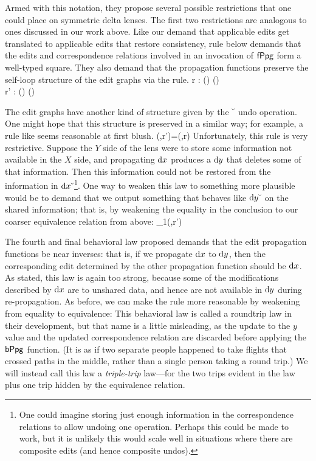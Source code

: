 Armed with this notation, they propose several possible restrictions that
one could place on symmetric delta lenses. The first two restrictions are
analogous to ones discussed in our work above. Like our demand that
applicable edits get translated to applicable edits that restore
consistency, rule  below demands that the edits and
correspondence relations involved in an invocation of $\mathsf{fPpg}$ form a
well-typed square. They also demand that the propagation functions preserve
the self-loop structure of the edit graphs via the  rule.
    {r  : \mldom(\dx) \uedge \mldom(\dy) \\
     r' : \mlcod(\dx) \uedge \mlcod(\dy)}

The edit graphs have another kind of structure given by the $\breve{\ }$
undo operation. One might hope that this structure is preserved in a similar
way; for example, a rule like  seems reasonable at first
blush.
    {\mlfppg(\dx\swoop,r')=(\dy\swoop,r)}
Unfortunately, this rule is very restrictive. Suppose the $Y$ side of the
lens were to store some information not available in the $X$ side, and
propagating $\textrm{d} x$ produces a $\textrm{d} y$ that deletes some of that information.
Then this information could not be restored from the information in
$\textrm{d} x\breve{\ }$\footnote{One could imagine storing just enough information in
the correspondence relations to allow undoing one operation. Perhaps this
could be made to work, but it is unlikely this would scale well in
situations where there are composite edits (and hence composite undos).}.
One way to weaken this law to something more plausible would be to demand
that we output something that behaves like $\textrm{d} y\breve{\ }$ on the shared
information; that is, by weakening the equality in the conclusion to our
coarser equivalence relation from above:
    {\mlfppg_1(\dx\swoop,r')  \dy\swoop}

The fourth and final behavioral law proposed demands that the edit
propagation functions be near inverses: that is, if we propagate $\textrm{d} x$ to
$\textrm{d} y$, then the corresponding edit determined by the other propagation
function should be $\textrm{d} x$. As stated, this law is again too strong, because
some of the modifications described by $\textrm{d} x$ are to unshared data, and hence
are not available in $\textrm{d} y$ during re-propagation. As before, we can make the
rule more reasonable by weakening from equality to equivalence:
This behavioral law is called a roundtrip law in their development, but that
name is a little misleading, as the update to the $y$ value and the updated
correspondence relation are discarded before applying the $\mathsf{bPpg}$
function. (It is as if two separate people happened to take flights that
crossed paths in the middle, rather than a single person taking a round
trip.) We will instead call this law a \emph{triple-trip} law---for the two
trips evident in the law plus one trip hidden by the equivalence relation.


